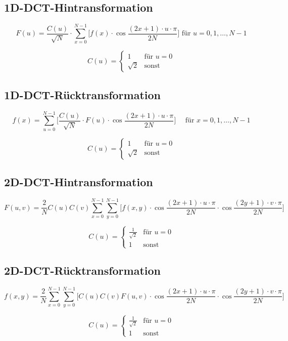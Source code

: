 \subsection*{1D-DCT-Hintransformation}
\[
F(u) = \frac{C(u)}{\sqrt{N}}
	\cdot \sum_{x=0}^{N-1} \bigg[ f(x)
	\cdot \cos{\frac{(2x+1) \cdot u \cdot \pi{}}{2N}}
	\bigg] \mbox{  für } u=0,1,\ldots,N-1
\]
	
\[
    C(u) = \begin{cases}
        1 & \text{für } u=0\\
        \sqrt{2} & \text{sonst}
    \end{cases}
\]

\subsection*{1D-DCT-Rücktransformation}
\[
    f(x) = \sum_{u=0}^{N-1} \bigg[ \frac{C(u)}{\sqrt{N}}
	\cdot F(u)
	\cdot \cos{\frac{(2x+1) \cdot u \cdot \pi{}}{2N}}
	\bigg] \quad \mbox{ für } x=0,1,\ldots,N-1
\]
	
\[
    C(u) = \begin{cases}
        1 & \text{für } u=0\\
        \sqrt{2} & \text{sonst}
    \end{cases}
\]

\subsection*{2D-DCT-Hintransformation}
\[
    F(u, v) = \frac{2}{N} C(u) C(v) \sum_{x=0}^{N-1} \sum_{y=0}^{N-1} \bigg[ f(x, y) \cdot 
    \cos \frac{(2x + 1) \cdot u \cdot \pi}{2 N} \cdot \cos \frac{(2y + 1) \cdot v \cdot \pi}{2 N} \bigg]
\]
	
\[
    C(u) = \begin{cases}
        \frac{1}{\sqrt{2}} & \text{für } u=0\\
        1 & \text{sonst}
    \end{cases}
\]

\subsection*{2D-DCT-Rücktransformation}
\[
    f(x, y) = \frac{2}{N} \sum_{x=0}^{N-1} \sum_{y=0}^{N-1} \bigg[ C(u) C(v) F(u, v) \cdot 
    \cos \frac{(2x + 1) \cdot u \cdot \pi}{2 N} \cdot \cos \frac{(2y + 1) \cdot v \cdot \pi}{2 N} \bigg]
\]
	
\[
    C(u) = \begin{cases}
        \frac{1}{\sqrt{2}} & \text{für } u=0\\
        1 & \text{sonst}
    \end{cases}
\]
